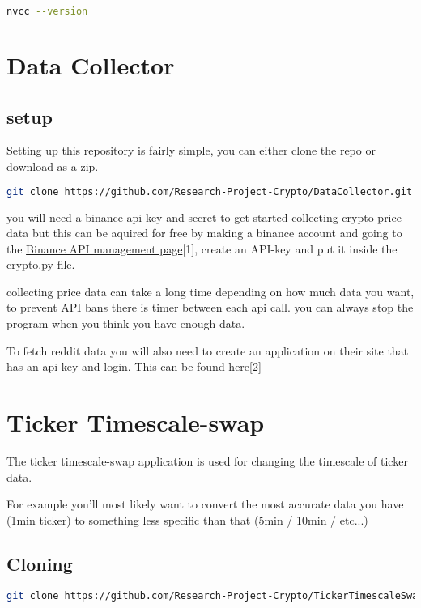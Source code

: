 \documentclass[12pt,a4paper]{article}
\begin{document}
\begin{lstlisting}[language=bash]
    nvcc --version
\end{lstlisting}


\section{Data Collector}

\subsection{setup}
Setting up this repository is fairly simple, you can either clone the repo or download as a zip.

\begin{lstlisting}[language=bash]
git clone https://github.com/Research-Project-Crypto/DataCollector.git 
\end{lstlisting}

you will need a binance api key and secret to get started collecting crypto price data but this can be aquired for free by making a binance account and going to the \href{https://www.binance.com/en/my/settings/api-management}{Binance API management page}[1], create an API-key and put it inside the crypto.py file.

collecting price data can take a long time depending on how much data you want, to prevent API bans there is timer between each api call. you can always stop the program when you think you have enough data.

To fetch reddit data you will also need to create an application on their site that has an api key and login. This can be found \href{https://www.reddit.com/prefs/apps}{here}[2]

\section{Ticker Timescale-swap}

The ticker timescale-swap application is used for changing the timescale of ticker data.

For example you'll most likely want to convert the most accurate data you have (1min ticker) to something less specific than that (5min / 10min / etc...)

\subsection{Cloning}

\begin{lstlisting}[language=bash]
git clone https://github.com/Research-Project-Crypto/TickerTimescaleSwap.git --recursive
\end{lstlisting}
\end{document}
